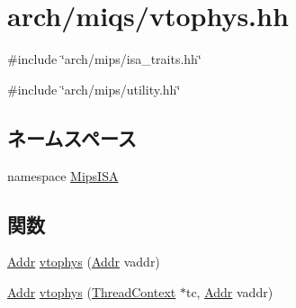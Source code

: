 \hypertarget{miqs_2vtophys_8hh}{
\section{arch/miqs/vtophys.hh}
\label{miqs_2vtophys_8hh}
}
{\ttfamily \#include \char`\"{}arch/mips/isa\_\-traits.hh\char`\"{}}\par
{\ttfamily \#include \char`\"{}arch/mips/utility.hh\char`\"{}}\par
\subsection*{ネームスペース}
\begin{DoxyCompactItemize}
\item 
namespace \hyperlink{namespaceMipsISA}{MipsISA}
\end{DoxyCompactItemize}
\subsection*{関数}
\begin{DoxyCompactItemize}
\item 
\hyperlink{classm5_1_1params_1_1Addr}{Addr} \hyperlink{namespaceMipsISA_a3828815371ad2b0a1be60abdcb405cf9}{vtophys} (\hyperlink{classm5_1_1params_1_1Addr}{Addr} vaddr)
\item 
\hyperlink{classm5_1_1params_1_1Addr}{Addr} \hyperlink{namespaceMipsISA_ad4bbbca3210dee66152520984c3aac6a}{vtophys} (\hyperlink{classThreadContext}{ThreadContext} $\ast$tc, \hyperlink{classm5_1_1params_1_1Addr}{Addr} vaddr)
\end{DoxyCompactItemize}
